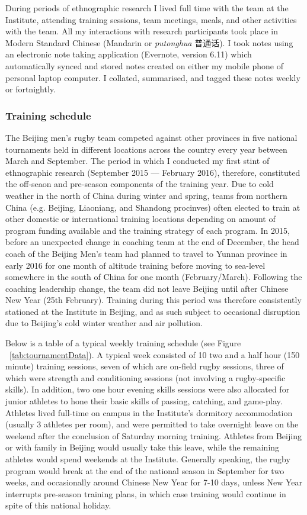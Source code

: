 During periods of ethnographic research I lived full time with the team at the Institute, attending training sessions, team meetings, meals, and other activities with the team.   All my interactions with research participants took place in Modern Standard Chinese (Mandarin or \textit{putonghua} 普通话).  I took notes using an electronic note taking application (Evernote, version 6.11) which automatically synced and stored notes created on either my mobile phone of personal laptop computer. I collated, summarised, and tagged these notes weekly or fortnightly.


\subsubsection{Training schedule}

 The Beijing men's rugby team competed against other provinces in five national tournaments held in different locations across the country   every year between March and September. The period in which I conducted my first stint of ethnographic research (September 2015 –-- February 2016), therefore, constituted the off-seaon and pre-season components of the training year.  Due to cold weather in the north of China during winter and spring, teams from northern China (e.g. Beijing, Liaoniang, and Shandong procinves) often elected to train   at other domestic or international training locations depending on amount of program funding available and the training strategy of each program.  In 2015, before an unexpected change in coaching team at the end of December, the head coach of the Beijing Men's team had planned to travel to Yunnan province in early 2016 for one month of altitude training before moving to sea-level somewhere in the south of China for one month (February/March).  Following the coaching leadership change, the team did not leave Beijing until after Chinese New Year (25th February). Training during this period was therefore consistently stationed at the Institute in Beijing, and as such subject to occasional disruption due to Beijing's cold winter weather and air pollution.

 Below is a table of a typical weekly training schedule (see Figure ~\ref{tab:tournamentData}). A typical week consisted of 10 two and a half hour (150 minute) training sessions, seven of which are on-field rugby sessions, three of which were strength and conditioning sessions (not involving a rugby-specific skills).  In addition, two one hour evening skills sessions were also allocated for junior athletes to hone their basic skills of passing, catching, and game-play.  Athletes lived full-time on campus in the Institute's dormitory accommodation (usually 3 athletes per room), and were permitted to take overnight leave on the weekend after the conclusion of Saturday morning training.  Athletes from Beijing or with family in Beijing would usually take this leave, while the remaining athletes would spend weekends at the Institute.  Generally speaking, the rugby program would break at the end of the national season in September for two weeks, and occasionally around Chinese New Year for 7-10 days, unless New Year interrupts pre-season training plans, in which case training would continue in spite of this national holiday.

